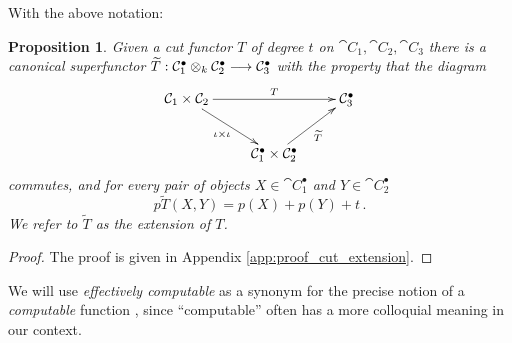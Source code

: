 \documentclass[english,letter paper,12pt,leqno]{article}
\newtheorem{proposition}[theorem]{Proposition}
\theoremstyle{example}
\numberwithin{equation}{section}
\begin{document}
With the above notation:

\begin{proposition}\label{prop:extend_cut_functor} Given a cut functor $T$ of degree $t$ on $\cat{C}_1, \cat{C}_2,\cat{C}_3$ there is a canonical superfunctor $\widetilde{T}: \mathcal{C}_1^\bullet \otimes_k \mathcal{C}_2^\bullet \longrightarrow \mathcal{C}_3^\bullet$ with the property that the diagram
\[
\xymatrix{
\cat{C}_1 \times \cat{C}_2 \ar[dr]_-{\iota \times \iota} \ar[rr]^-{T} & & \cat{C}_3^\bullet\\
& \cat{C}_1^\bullet \times \cat{C}_2^\bullet \ar[ur]_-{\widetilde{T}}
}
\]
commutes, and for every pair of objects $X \in \cat{C}_1^\bullet$ and $Y \in \cat{C}_2^\bullet$
\[
p \widetilde{T}( X, Y ) = p( X ) + p( Y ) + t\,.
\]
We refer to $\widetilde{T}$ as the \emph{extension} of $T$.
\end{proposition}
\begin{proof}
The proof is given in Appendix \ref{app:proof_cut_extension}.
\end{proof}

We will use \emph{effectively computable} as a synonym for the precise notion of a \emph{computable} function \cite{enderton}, since ``computable'' often has a more colloquial meaning in our context.
\end{document}
